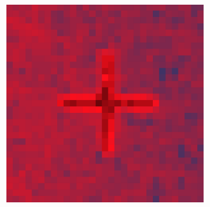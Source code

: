 \documentclass[10pt]{scrartcl}
\begin{document}
\begin{figure}[!ht]
\begin{subfigure}[b]{.3\linewidth}
    \end{subfigure}
    \begin{subfigure}[b]{.3\linewidth}
        \centering
        \includegraphics[width=1.2\linewidth]{../plots_tables_images/1d1dcrop_0_4.eps}
    \end{subfigure}


\end{figure}
\end{document}
